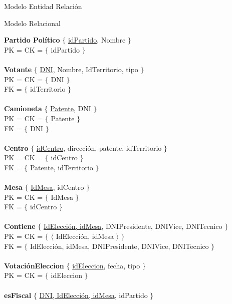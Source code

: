 \begin{section}{Modelo Entidad Relaci\'on}

\begin{subsection}{Modelo Relacional}

\noindent \textbf{Partido Pol\'itico} $\lbrace$ \underline{idPartido}, Nombre $\rbrace$ \\
PK = CK = $ \lbrace $ idPartido $ \rbrace $ \\
\\
\textbf{Votante} $ \lbrace $ \underline{DNI}, Nombre, IdTerritorio, tipo $ \rbrace $\\
PK = CK = $ \lbrace $ DNI $ \rbrace $\\
FK = $ \lbrace $ idTerritorio $ \rbrace $\\
\\
\textbf{Camioneta} $ \lbrace $ \underline{Patente}, DNI $ \rbrace $\\
PK = CK = $ \lbrace $ Patente  $ \rbrace $\\
FK = $ \lbrace $ DNI $ \rbrace $\\
\\
\textbf{Centro} $ \lbrace $ \underline{idCentro}, direcci\'on, patente, idTerritorio $ \rbrace $ \\
PK = CK = $ \lbrace $ idCentro $ \rbrace $ \\
FK = $ \lbrace $ Patente, idTerritorio $ \rbrace $\\
\\
\textbf{Mesa} $ \lbrace $ \underline{IdMesa}, idCentro $ \rbrace $ \\
PK = CK = $ \lbrace $ IdMesa $ \rbrace $ \\
FK = $ \lbrace $ idCentro $ \rbrace $\\
\\
\textbf{Contiene} $ \lbrace $ \underline{IdElecci\'on, idMesa}, DNIPresidente, DNIVice, DNITecnico $ \rbrace $ \\
PK = CK = $ \lbrace $ $ \langle $ IdElecci\'on, idMesa $ \rangle $ $ \rbrace $ \\
FK = $ \lbrace $ IdElecci\'on, idMesa, DNIPresidente, DNIVice, DNITecnico $ \rbrace $\\
\\
\textbf{Votaci\'onEleccion} $ \lbrace $ \underline{idEleccion}, fecha, tipo $ \rbrace $ \\
PK = CK = $ \lbrace $ idEleccion $ \rbrace $ \\
\\
\textbf{esFiscal} $ \lbrace $ \underline{DNI, IdElecci\'on, idMesa}, idPartido $ \rbrace $ \\

\end{subsection}
\end{section}

